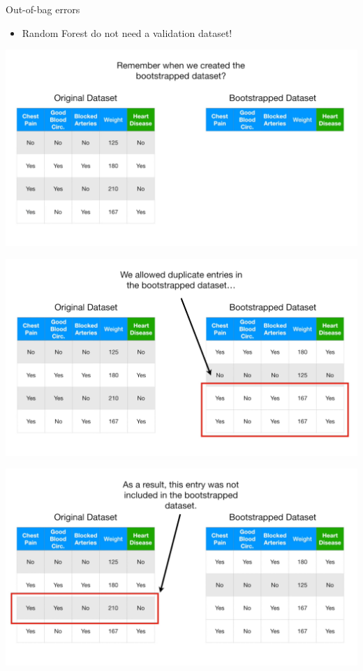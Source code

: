 \documentclass[
  ignorenonframetext,
]{beamer}
\providecommand{\tightlist}{%
  \setlength{\itemsep}{0pt}\setlength{\parskip}{0pt}}
\begin{document}
\begin{frame}{Out-of-bag errors}
\protect\hypertarget{out-of-bag-errors}{}
\begin{itemize}
\tightlist
\item
  Random Forest do not need a validation dataset!
\end{itemize}
\end{frame}

\begin{frame}{}
\protect\hypertarget{section-65}{}
\includegraphics{images/r66.png}
\end{frame}

\begin{frame}{}
\protect\hypertarget{section-66}{}
\includegraphics{images/r67.png}
\end{frame}

\begin{frame}{}
\protect\hypertarget{section-67}{}
\includegraphics{images/r68.png}
\end{frame}
\end{document}

